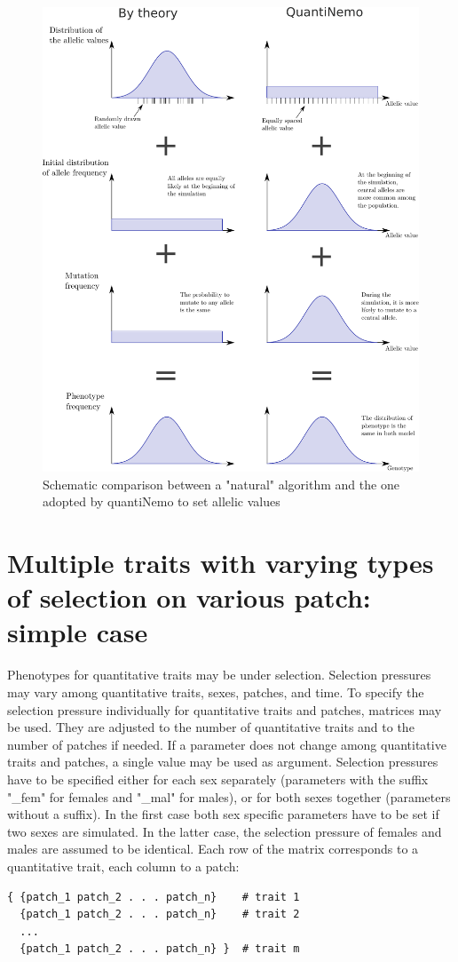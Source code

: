 \documentclass[letterpaper,12pt,oneside]{book}
\begin{document}
\begin{appendices}
\begin{figure}[H]
    \centering
        \includegraphics[width=1\textwidth]{equally_spaced_allele.pdf}
        \caption{Schematic comparison between a "natural" algorithm and the one adopted by quantiNemo to set allelic values}
    \label{fig:EquallySpacedAllele}
\end{figure}
\section{Multiple traits with varying types of selection on various patch: simple case }
Phenotypes for quantitative traits may be under selection. Selection pressures may vary among quantitative traits, sexes, patches, and time. To specify the selection pressure individually for quantitative traits and patches, matrices may be used. They are adjusted to the number of quantitative traits and to the number of patches if needed. If a parameter does not change among quantitative traits and patches, a single value may be used as argument. Selection pressures have to be specified either for each sex separately (parameters with the suffix "\_fem" for females and "\_mal" for males), or for both sexes together (parameters without a suffix). In the first case both sex specific parameters have to be set if two sexes are simulated. In the latter case, the selection pressure of females and males are assumed to be identical. Each row of the matrix corresponds to a quantitative trait, each column to a patch:
\begin{lstlisting}[frame=single]
{ {patch_1 patch_2 . . . patch_n}    # trait 1
  {patch_1 patch_2 . . . patch_n}    # trait 2
  ...
  {patch_1 patch_2 . . . patch_n} }  # trait m
\end{lstlisting}


\end{appendices}
\end{document}
